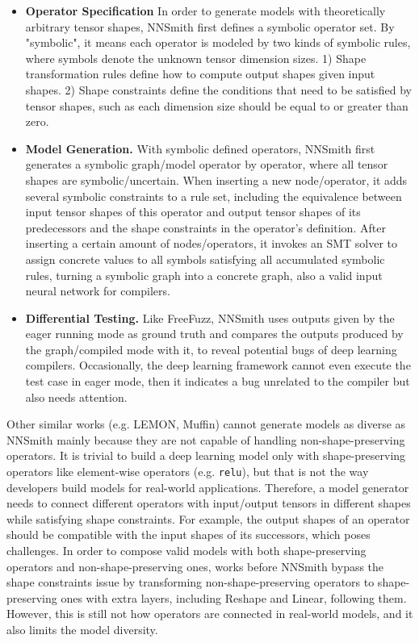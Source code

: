 \begin{survey}
\begin{itemize}
    \item \textbf{Operator Specification} In order to generate models with theoretically arbitrary tensor shapes, NNSmith first defines a symbolic operator set. By "symbolic", it means each operator is modeled by two kinds of symbolic rules, where symbols denote the unknown tensor dimension sizes. 1) Shape transformation rules define how to compute output shapes given input shapes. 2) Shape constraints define the conditions that need to be satisfied by tensor shapes, such as each dimension size should be equal to or greater than zero.
    \item \textbf{Model Generation.} With symbolic defined operators, NNSmith first generates a symbolic graph/model operator by operator, where all tensor shapes are symbolic/uncertain. When inserting a new node/operator, it adds several symbolic constraints to a rule set, including the equivalence between input tensor shapes of this operator and output tensor shapes of its predecessors and the shape constraints in the operator's definition. After inserting a certain amount of nodes/operators, it invokes an SMT solver to assign concrete values to all symbols satisfying all accumulated symbolic rules, turning a symbolic graph into a concrete graph, also a valid input neural network for compilers.
    \item \textbf{Differential Testing.} Like FreeFuzz, NNSmith uses outputs given by the eager running mode as ground truth and compares the outputs produced by the graph/compiled mode with it, to reveal potential bugs of deep learning compilers. Occasionally, the deep learning framework cannot even execute the test case in eager mode, then it indicates a bug unrelated to the compiler but also needs attention.
\end{itemize}

Other similar works (e.g. LEMON, Muffin) cannot generate models as diverse as NNSmith mainly because they are not capable of handling non-shape-preserving operators. It is trivial to build a deep learning model only with shape-preserving operators like element-wise operators (e.g. \texttt{relu}), but that is not the way developers build models for real-world applications. Therefore, a model generator needs to connect different operators with input/output tensors in different shapes while satisfying shape constraints. For example, the output shapes of an operator should be compatible with the input shapes of its successors, which poses challenges. In order to compose valid models with both shape-preserving operators and non-shape-preserving ones, works before NNSmith bypass the shape constraints issue by transforming non-shape-preserving operators to shape-preserving ones with extra layers, including Reshape and Linear, following them. However, this is still not how operators are connected in real-world models, and it also limits the model diversity.


\end{survey}

